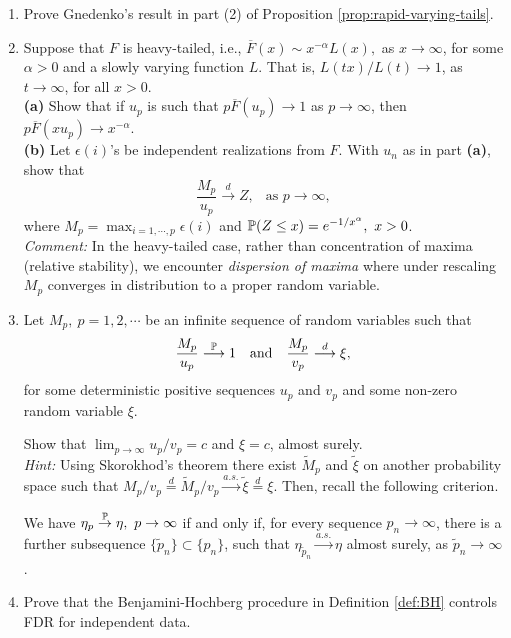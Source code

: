 \begin{enumerate}
 \item Prove Gnedenko's result in part (2) of Proposition \ref{prop:rapid-varying-tails}.\\
 
\item Suppose that $F$ is heavy-tailed, i.e., $\overline F(x) \sim x^{-\alpha} L(x),$ as $x\to\infty$, for some $\alpha>0$ and a
slowly varying function $L$.  That is, $L(tx)/L(t)\to 1$, as $t\to\infty$, for all $x>0$.\\

{\bf (a)} Show that if $u_p$ is such that $p\overline F(u_p)\to 1$ as $p\to\infty$, then $p \overline F(x u_p)\to x^{-\alpha}$.\\

{\bf (b)} Let $\epsilon(i)$'s be independent realizations from $F$. With $u_n$ as in part {\bf (a)}, show that
$$ 
\frac{M_p}{u_p} \stackrel{d}{\longrightarrow} Z,\ \ \mbox{ as }p\to\infty,
$$ 
where $M_p = \max_{i=1,\cdots,p} \epsilon(i)$ and $\P(Z\le x) = e^{-1/x^\alpha},\ x>0$.\\

{\em Comment:} In the heavy-tailed case, rather than concentration of maxima (relative stability),
we encounter {\em dispersion of maxima} where under rescaling $M_p$ converges in distribution to a proper random variable.\\

\item Let  $M_p,\ p=1,2,\cdots$  be an infinite sequence of random variables such that
$$
\frac{M_p}{u_p} \stackrel{\P}{\longrightarrow} 1\ \ \mbox{ and }\ \ \frac{M_p}{v_p} \stackrel{d}{\longrightarrow} \xi,
$$
for some deterministic positive sequences  $u_p$ and $v_p$ and some non-zero random variable $\xi$.

Show that $\lim_{p\to\infty} u_p/v_p = c$ and $\xi = c$, almost surely.\\

{\em Hint:} Using Skorokhod's theorem there exist $\widetilde M_p$ and $\widetilde \xi$ on another probability space
such that $M_p/v_p\stackrel{d}{=}\widetilde M_p/v_p \stackrel{a.s.}{\to} \widetilde \xi \stackrel{d}{=}\xi$.
Then, recall the following criterion.

\begin{lemma} We have $\eta_p\stackrel{\P}{\to} \eta,\ p\to\infty$ if and only if, for every sequence $p_n\to \infty$, there is a further
subsequence $\{\widetilde p_n\}\subset\{p_n\}$, such that $\eta_{\widetilde p_n} \stackrel{a.s.}{\to} \eta$ almost surely, as $\widetilde p_n\to
\infty$.
\end{lemma}

\item Prove that the Benjamini-Hochberg procedure in Definition \ref{def:BH} controls FDR for independent data.\\



\end{enumerate}
